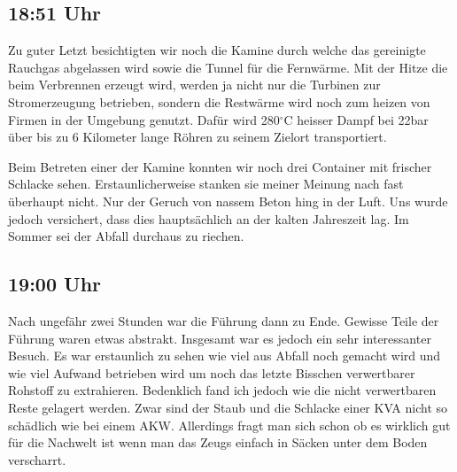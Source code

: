 \begin{center}
\end{center}

\subsection{18:51 Uhr}
\label{sec-2-11}
Zu guter Letzt besichtigten wir noch die Kamine durch welche das
gereinigte Rauchgas abgelassen wird sowie die Tunnel für die
Fernwärme.  Mit der Hitze die beim Verbrennen erzeugt wird, werden ja
nicht nur die Turbinen zur Stromerzeugung betrieben, sondern die
Restwärme wird noch zum heizen von Firmen in der Umgebung
genutzt. Dafür wird 280\(^{\circ}\)C heisser Dampf bei 22bar über bis
zu 6 Kilometer lange Röhren zu seinem Zielort transportiert.

Beim Betreten einer der Kamine konnten wir noch drei Container mit
frischer Schlacke sehen. Erstaunlicherweise stanken sie meiner Meinung
nach fast überhaupt nicht. Nur der Geruch von nassem Beton hing in der
Luft. Uns wurde jedoch versichert, dass dies hauptsächlich an der
kalten Jahreszeit lag. Im Sommer sei der Abfall durchaus zu riechen.

\begin{center}
\end{center}

\subsection{19:00 Uhr}
\label{sec-2-12}
Nach ungefähr zwei Stunden war die Führung dann zu Ende.  Gewisse
Teile der Führung waren etwas abstrakt. Insgesamt war es jedoch ein
sehr interessanter Besuch.  Es war erstaunlich zu sehen wie viel aus
Abfall noch gemacht wird und wie viel Aufwand betrieben wird um noch
das letzte Bisschen verwertbarer Rohstoff zu extrahieren.
Bedenklich fand ich jedoch wie die nicht verwertbaren Reste gelagert
werden. Zwar sind der Staub und die Schlacke einer KVA nicht
so schädlich wie bei einem AKW. Allerdings fragt man sich schon
ob es wirklich gut für die Nachwelt ist wenn man das Zeugs einfach
in Säcken unter dem Boden verscharrt.

